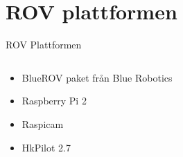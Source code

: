 \documentclass[11pt,aspectratio=169]{beamer}
\begin{document}
\section{ROV plattformen}
\begin{frame}{ROV Plattformen}
\begin{columns}
\begin{column}{0.5\textwidth}
\begin{itemize}
\item {} {BlueROV paket från Blue Robotics}
\item {} {Raspberry Pi 2}
\item {} {Raspicam}
\item {} {HkPilot 2.7}
\end{itemize}
\end{column}
\begin{column}{0.5\textwidth}


\end{column}
\end{columns}
\end{frame}
\end{document}
